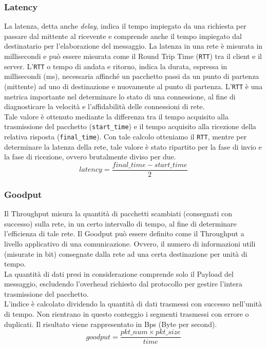 \subsubsection{Latency}
La latenza, detta anche \textit{delay}, indica il tempo impiegato da una richiesta per passare dal mittente al ricevente e comprende anche il tempo impiegato dal destinatario per l'elaborazione del messaggio. La latenza in una rete è misurata in millisecondi e può essere misurata come il Round Trip Time (\texttt{RTT}) tra il client e il server. L'\texttt{RTT} o tempo di andata e ritorno, indica la durata, espressa in millisecondi (ms), necessaria affinché un pacchetto passi da un punto di partenza (mittente) ad uno di destinazione e nuovamente al punto di partenza. L'\texttt{RTT} è una metrica importante nel determinare lo stato di una connessione, al fine di diagnosticare la velocità e l'affidabilità delle connessioni di rete.\\
Tale valore è ottenuto mediante la differenza tra il tempo acquisito alla trasmissione del pacchetto (\texttt{start\_time}) e il tempo acquisito alla ricezione della relativa risposta (\texttt{final\_time}). Con tale calcolo otteniamo il \texttt{RTT}, mentre per determinare la latenza della rete, tale valore è stato ripartito per la fase di invio e la fase di ricezione, ovvero brutalmente diviso per due.
$$ latency = \frac{final\_time - start\_time}{2} $$

\subsubsection{Goodput}
Il Throughput misura la quantità di pacchetti scambiati (consegnati con successo) sulla rete, in un certo intervallo di tempo, al fine di determinare l'efficienza di tale rete. Il Goodput può essere definito come il Throughput a livello applicativo di una comunicazione. Ovvero, il numero di informazioni utili (misurate in bit) consegnate dalla rete ad una certa destinazione per unità di tempo.\\
La quantità di dati presi in considerazione comprende solo il Payload del messaggio, escludendo l'overhead richiesto dal protocollo per gestire l'intera trasmissione del pacchetto.\\
L'indice è calcolato dividendo la quantità di dati trasmessi con successo nell'unità di tempo. Non rientrano in questo conteggio i segmenti trasmessi con errore o duplicati. Il risultato viene rappresentato in Bps (Byte per second).
$$ goodput = \frac{pkt\_num \times pkt\_size}{time} $$

